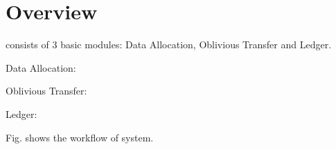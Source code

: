 \section{\name Overview}
\name consists of 3 basic modules: Data Allocation, Oblivious Transfer and Ledger.

Data Allocation:

Oblivious Transfer:

Ledger:

Fig. \fillme shows the workflow of \name system.


